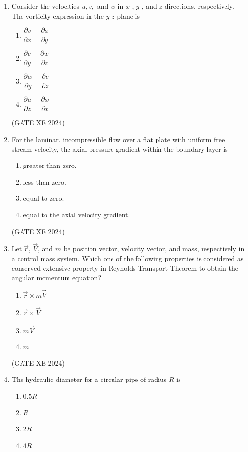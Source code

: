 \documentclass[12pt]{article}
\begin{document}
\begin{enumerate}
(GATE XE 2024)

\item Consider the velocities $u, v,$ and $w$ in $x$-, $y$-, and $z$-directions, respectively. The vorticity expression in the $y$-$z$ plane is
\begin{enumerate}
\item $\dfrac{\partial v}{\partial x}-\dfrac{\partial u}{\partial y}$
\item $\dfrac{\partial v}{\partial y}-\dfrac{\partial w}{\partial z}$
\item $\dfrac{\partial w}{\partial y}-\dfrac{\partial v}{\partial z}$
\item $\dfrac{\partial u}{\partial z}-\dfrac{\partial w}{\partial x}$
\end{enumerate}

(GATE XE 2024)

\item For the laminar, incompressible flow over a flat plate with uniform free stream velocity, the axial pressure gradient within the boundary layer is
\begin{enumerate}
\item greater than zero.
\item less than zero.
\item equal to zero.
\item equal to the axial velocity gradient.
\end{enumerate}

(GATE XE 2024)

\item Let $\vec{r}$, $\vec{V}$, and $m$ be position vector, velocity vector, and mass, respectively in a control mass system. Which one of the following properties is considered as conserved extensive property in Reynolds Transport Theorem to obtain the angular momentum equation?
\begin{enumerate}
\item $\vec{r}\times m\vec{V}$
\item $\vec{r}\times \vec{V}$
\item $m\vec{V}$
\item $m$
\end{enumerate}

(GATE XE 2024)

\item The hydraulic diameter for a circular pipe of radius $R$ is
\begin{enumerate}
\item $0.5R$
\item $R$
\item $2R$
\item $4R$
\end{enumerate}


\end{enumerate}
\end{document}
